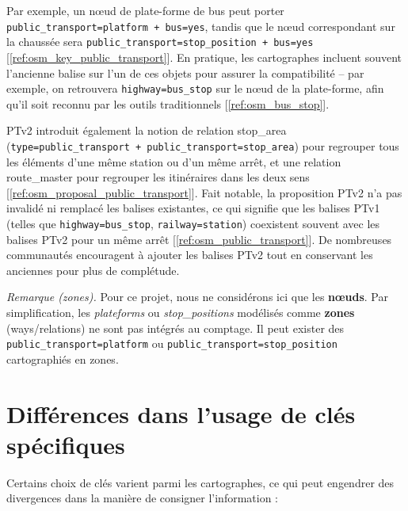 \begin{itemize}
    Par exemple, un nœud de plate-forme de bus peut porter \texttt{public\_transport=platform + bus=yes}, tandis que le nœud correspondant sur la chaussée sera \texttt{public\_transport=stop\_position + bus=yes} [\ref{ref:osm_key_public_transport}]. En pratique, les cartographes incluent souvent l’ancienne balise sur l’un de ces objets pour assurer la compatibilité – par exemple, on retrouvera \texttt{highway=bus\_stop} sur le nœud de la plate-forme, afin qu’il soit reconnu par les outils traditionnels [\ref{ref:osm_bus_stop}].
    
    PTv2 introduit également la notion de relation stop\_area (\texttt{type=public\_transport + public\_transport=stop\_area}) pour regrouper tous les éléments d’une même station ou d’un même arrêt, et une relation route\_master pour regrouper les itinéraires dans les deux sens [\ref{ref:osm_proposal_public_transport}]. Fait notable, la proposition PTv2 n’a pas invalidé ni remplacé les balises existantes, ce qui signifie que les balises PTv1 (telles que \texttt{highway=bus\_stop}, \texttt{railway=station}) coexistent souvent avec les balises PTv2 pour un même arrêt [\ref{ref:osm_public_transport}]. De nombreuses communautés encouragent à ajouter les balises PTv2 tout en conservant les anciennes pour plus de complétude.
\end{itemize}


\noindent\textit{Remarque (zones).} Pour ce projet, nous ne considérons ici que les \textbf{nœuds}. Par simplification, les \textit{plateforms} ou \textit{stop\_positions} modélisés comme \textbf{zones} (ways/relations) ne sont pas intégrés au comptage. Il peut exister des \texttt{public\_transport=platform} ou \texttt{public\_transport=stop\_position} cartographiés en zones.


\section{Différences dans l’usage de clés spécifiques}
Certains choix de clés varient parmi les cartographes, ce qui peut engendrer des divergences dans la manière de consigner l'information :


